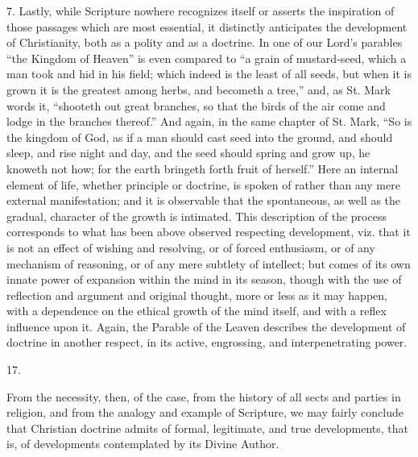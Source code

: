 7. Lastly, while Scripture nowhere recognizes itself
or asserts the inspiration of those passages which are
most essential, it distinctly anticipates the development
of Christianity, both as a polity and as a doctrine. In
one of our Lord's parables ``the Kingdom of Heaven'' is even compared to ``a grain of mustard-seed,
which a man took and hid in his field; which indeed is
the least of all seeds, but when it is grown it is the
greatest among herbs, and becometh a tree,'' and, as
St. Mark words it, ``shooteth out great branches, so
that the birds of the air come and lodge in the branches
thereof.'' And again, in the same chapter of St.
Mark, ``So is the kingdom of God, as if a man should
cast seed into the ground, and should sleep, and rise
night and day, and the seed should spring and grow up, he
knoweth not how; for the earth bringeth forth fruit of
herself.'' Here an internal element of life, whether
principle or doctrine, is spoken of rather than any mere
external manifestation; and it is observable that the
spontaneous, as well as the gradual, character of the
growth is intimated. This description of the process
corresponds to what has been above observed respecting
development, viz. that it is not an effect of wishing and
resolving, or of forced enthusiasm, or of any mechanism
of reasoning, or of any mere subtlety of intellect; but
comes of its own innate power of expansion within the
mind in its season, though with the use of reflection and argument and original thought, more or less as it may
happen, with a dependence on the ethical growth of the
mind itself, and with a reflex influence upon it. Again,
the Parable of the Leaven describes the development of
doctrine in another respect, in its active, engrossing,
and interpenetrating power.

17.

From the necessity, then, of the case, from the
history of all sects and parties in religion, and from
the analogy and example of Scripture, we may fairly
conclude that Christian doctrine admits of formal,
legitimate, and true developments, that is, of
developments contemplated by its Divine Author.

\textbf{}

